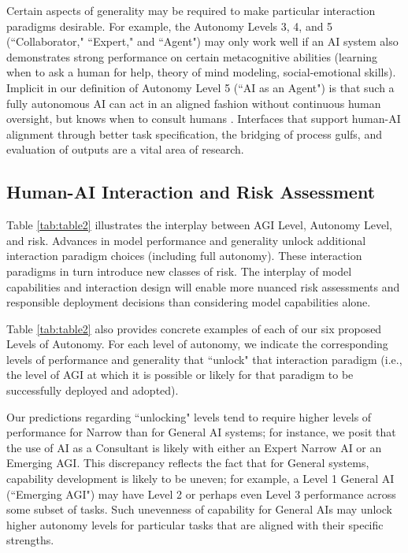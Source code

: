 \documentclass{article}
\theoremstyle{plain}
\theoremstyle{definition}
\theoremstyle{remark}
\begin{document}
Certain aspects of generality may be required to make particular interaction paradigms desirable. For example, the Autonomy Levels 3, 4, and 5 (``Collaborator," ``Expert," and ``Agent") may only work well if an AI system also demonstrates strong performance on certain metacognitive abilities (learning when to ask a human for help, theory of mind modeling, social-emotional skills). Implicit in our definition of Autonomy Level 5 (``AI as an Agent") is that such a fully autonomous AI can act in an aligned fashion without continuous human oversight, but knows when to consult humans \citep{shah2021benefits}. Interfaces that support human-AI alignment through better task specification, the bridging of process gulfs, and evaluation of outputs \citep{terryHCIAlignment} are a vital area of research.

\subsection{Human-AI Interaction and Risk Assessment}
\label{hai}

Table \ref{tab:table2} illustrates the interplay between AGI Level, Autonomy Level, and risk. Advances in model performance and generality unlock additional interaction paradigm choices (including full autonomy). These interaction paradigms in turn introduce new classes of risk. The interplay of model capabilities and interaction design will enable more nuanced risk assessments and responsible deployment decisions than considering model capabilities alone.

Table \ref{tab:table2} also provides concrete examples of each of our six proposed Levels of Autonomy. For each level of autonomy, we indicate the corresponding levels of performance and generality that ``unlock" that interaction paradigm (i.e., the level of AGI at which it is possible or likely for that paradigm to be successfully deployed and adopted). 

Our predictions regarding ``unlocking" levels tend to require higher levels of performance for Narrow than for General AI systems; for instance, we posit that the use of AI as a Consultant is likely with either an Expert Narrow AI or an Emerging AGI. This discrepancy reflects the fact that for General systems, capability development is likely to be uneven; for example, a Level 1 General AI (``Emerging AGI") may have Level 2 or perhaps even Level 3 performance across some subset of tasks. Such unevenness of capability for General AIs may unlock higher autonomy levels for particular tasks that are aligned with their specific strengths. 
\end{document}

